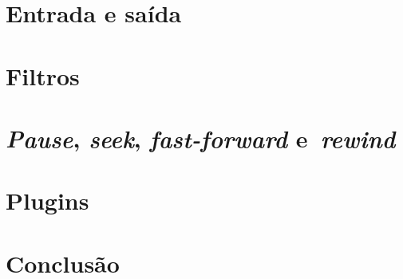 \documentclass{SBCbookchapter}
\begin{document}

\section{Entrada e saída}
\label{sec:e/s}


\section{Filtros}
\label{sec:filtros}


\section{\emph{Pause}, \emph{seek},
  \emph{fast-forward} e~\emph{rewind}}
\label{sec:ops}


\section{Plugins}
\label{sec:plugins}


\section{Conclusão}
\label{sec:conclusao}





\end{document}
